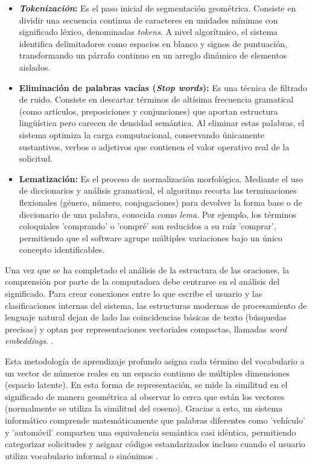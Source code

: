\begin{itemize}[topsep=0pt,itemsep=0pt,parsep=0pt,partopsep=0pt,leftmargin=*]
    \item \textbf{\emph{Tokenización}:} Es el paso inicial de segmentación geométrica. Consiste en dividir una secuencia continua de caracteres en unidades mínimas con significado léxico, denominadas \textit{tokens}. A nivel algorítmico, el sistema identifica delimitadores como espacios en blanco y signos de puntuación, transformando un párrafo continuo en un arreglo dinámico de elementos aislados.
    \item \textbf{Eliminación de palabras vacías (\textit{Stop words}):} Es una técnica de filtrado de ruido. Consiste en descartar términos de altísima frecuencia gramatical (como artículos, preposiciones y conjunciones) que aportan estructura lingüística pero carecen de densidad semántica. Al eliminar estas palabras, el sistema optimiza la carga computacional, conservando únicamente sustantivos, verbos o adjetivos que contienen el valor operativo real de la solicitud.
    \item \textbf{Lematización:} Es el proceso de normalización morfológica. Mediante el uso de diccionarios y análisis gramatical, el algoritmo recorta las terminaciones flexionales (género, número, conjugaciones) para devolver la forma base o de diccionario de una palabra, conocida como \textit{lema}. Por ejemplo, los términos coloquiales 'comprando' o 'compré' son reducidos a su raíz 'comprar', permitiendo que el software agrupe múltiples variaciones bajo un único concepto identificables.
\end{itemize}

Una vez que se ha completado el análisis de la estructura de las oraciones, la comprensión por parte de la computadora debe centrarse en el análisis del significado. Para crear conexiones entre lo que escribe el usuario y las clasificaciones internas del sistema, las estructuras modernas de procesamiento de lenguaje natural dejan de lado las coincidencias básicas de texto (búsquedas precisas) y optan por representaciones vectoriales compactas, llamadas \textit{word embeddings}. \cite{mikolov_word2vec_2013}. 

Esta metodología de aprendizaje profundo asigna cada término del vocabulario a un vector de números reales en un espacio continuo de múltiples dimensiones (espacio latente). En esta forma de representación, se mide la similitud en el significado de manera geométrica al observar lo cerca que están los vectores (normalmente se utiliza la similitud del coseno). Gracias a esto, un sistema informático comprende matemáticamente que palabras diferentes como 'vehículo' y 'automóvil' comparten una equivalencia semántica casi idéntica, permitiendo categorizar solicitudes y asignar códigos estandarizados incluso cuando el usuario utiliza vocabulario informal o sinónimos \cite{jurafsky_nlp_2023}.

